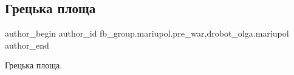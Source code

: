  
 
 
 
 

\subsection{Грецька площа}
\label{sec:06_03_2023.fb.fb_group.mariupol.pre_war.1.gretska_ploshcha}
 
\ifcmt
 author_begin
   author_id fb_group.mariupol.pre_war,drobot_olga.mariupol
 author_end
\fi

Грецька площа.

